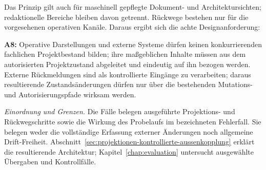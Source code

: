 Das Prinzip gilt auch für maschinell gepflegte Dokument- und
Architektursichten; redaktionelle Bereiche bleiben davon getrennt.
Rückwege bestehen nur für die vorgesehenen operativen Kanäle.
Daraus ergibt sich die achte Designanforderung:

\textbf{A8:} Operative Darstellungen und externe Systeme dürfen keinen
konkurrierenden fachlichen Projektbestand bilden; ihre maßgeblichen
Inhalte müssen aus dem autorisierten Projektzustand abgeleitet und
eindeutig auf ihn bezogen werden. Externe Rückmeldungen sind als
kontrollierte Eingänge zu verarbeiten; daraus resultierende
Zustandsänderungen dürfen nur über die bestehenden Mutations- und
Autorisierungspfade wirksam werden.

\emph{Einordnung und Grenzen.} Die Fälle belegen ausgeführte
Projektions- und Rückwegschritte sowie die Wirkung des Probelaufs
im bezeichneten Fehlerfall. Sie belegen weder die vollständige
Erfassung externer Änderungen noch allgemeine Drift-Freiheit.
Abschnitt~\ref{sec:projektionen-kontrollierte-aussenkopplung} erklärt
die resultierende Architektur; Kapitel~\ref{chap:evaluation}
untersucht ausgewählte Übergaben und Kontrollfälle.
